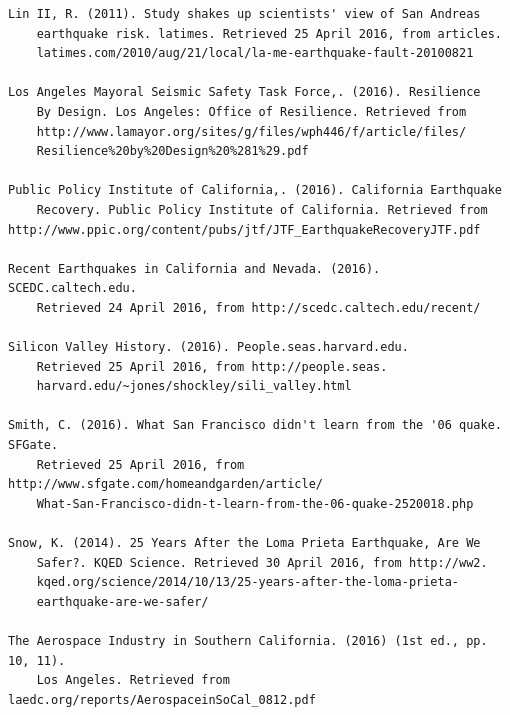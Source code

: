 \documentclass[12pt]{article}
\begin{document}
\begin{verbatim}
Lin II, R. (2011). Study shakes up scientists' view of San Andreas 
    earthquake risk. latimes. Retrieved 25 April 2016, from articles.
    latimes.com/2010/aug/21/local/la-me-earthquake-fault-20100821
    
Los Angeles Mayoral Seismic Safety Task Force,. (2016). Resilience 
    By Design. Los Angeles: Office of Resilience. Retrieved from
    http://www.lamayor.org/sites/g/files/wph446/f/article/files/
    Resilience%20by%20Design%20%281%29.pdf
    
Public Policy Institute of California,. (2016). California Earthquake 
    Recovery. Public Policy Institute of California. Retrieved from http://www.ppic.org/content/pubs/jtf/JTF_EarthquakeRecoveryJTF.pdf

Recent Earthquakes in California and Nevada. (2016). SCEDC.caltech.edu. 
    Retrieved 24 April 2016, from http://scedc.caltech.edu/recent/
    
Silicon Valley History. (2016). People.seas.harvard.edu. 
    Retrieved 25 April 2016, from http://people.seas.
    harvard.edu/~jones/shockley/sili_valley.html

Smith, C. (2016). What San Francisco didn't learn from the '06 quake. SFGate. 
    Retrieved 25 April 2016, from http://www.sfgate.com/homeandgarden/article/
    What-San-Francisco-didn-t-learn-from-the-06-quake-2520018.php
    
Snow, K. (2014). 25 Years After the Loma Prieta Earthquake, Are We 
    Safer?. KQED Science. Retrieved 30 April 2016, from http://ww2.
    kqed.org/science/2014/10/13/25-years-after-the-loma-prieta-
    earthquake-are-we-safer/

The Aerospace Industry in Southern California. (2016) (1st ed., pp. 10, 11). 
    Los Angeles. Retrieved from laedc.org/reports/AerospaceinSoCal_0812.pdf
\end{verbatim}
\end{document}
